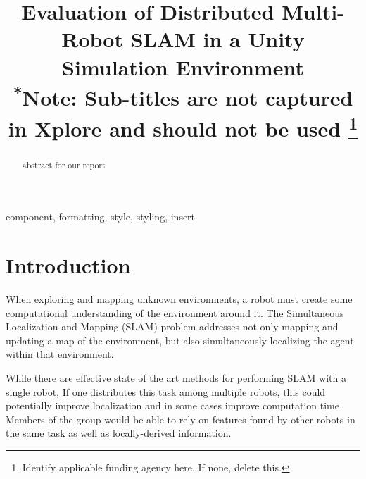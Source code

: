 \documentclass[conference]{IEEEtran}
\begin{document}
\title{Evaluation of Distributed Multi-Robot SLAM in a Unity Simulation Environment\\
{\footnotesize \textsuperscript{*}Note: Sub-titles are not captured in Xplore and
should not be used}
\thanks{Identify applicable funding agency here. If none, delete this.}
}

\author{
\and
{}
}

\maketitle

\begin{abstract}
abstract for our report
\end{abstract}

\begin{IEEEkeywords}
component, formatting, style, styling, insert
\end{IEEEkeywords}


\section{Introduction}
When exploring and mapping unknown environments, a robot must create some computational understanding of the environment around it. The Simultaneous Localization and Mapping (SLAM) problem addresses not only mapping and updating a map of the environment, but also simultaneously localizing the agent within that environment.

While there are effective state of the art methods for performing SLAM with a single robot, If one distributes this task among multiple robots, this could potentially improve localization \cite{1067998} and in some cases improve computation time \cite{Bonin} Members of the group would be able to rely on features found by other robots in the same task as well as locally-derived information.
\end{document}
